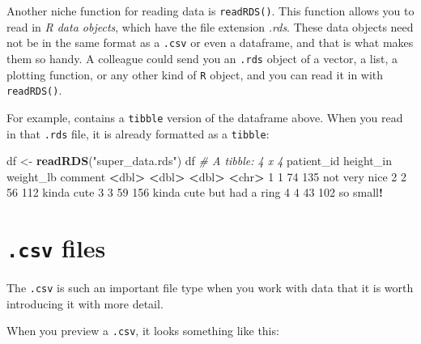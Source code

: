 \documentclass[]{book}
\newenvironment{Shaded}{\begin{snugshade}}{\end{snugshade}}
\newcommand{\CommentTok}[1]{\textcolor[rgb]{0.56,0.35,0.01}{\textit{#1}}}
\newcommand{\DecValTok}[1]{\textcolor[rgb]{0.00,0.00,0.81}{#1}}
\newcommand{\ErrorTok}[1]{\textcolor[rgb]{0.64,0.00,0.00}{\textbf{#1}}}
\newcommand{\KeywordTok}[1]{\textcolor[rgb]{0.13,0.29,0.53}{\textbf{#1}}}
\newcommand{\NormalTok}[1]{#1}
\newcommand{\OperatorTok}[1]{\textcolor[rgb]{0.81,0.36,0.00}{\textbf{#1}}}
\newcommand{\StringTok}[1]{\textcolor[rgb]{0.31,0.60,0.02}{#1}}
\begin{document}
Another niche function for reading data is \texttt{readRDS()}. This function allows you to read in \emph{R data objects}, which have the file extension \emph{.rds}. These data objects need not be in the same format as a \texttt{.csv} or even a dataframe, and that is what makes them so handy. A colleague could send you an \texttt{.rds} object of a vector, a list, a plotting function, or any other kind of \texttt{R} object, and you can read it in with \texttt{readRDS()}.

For example, contains a \texttt{tibble} version of the dataframe above. When you read in that \texttt{.rds} file, it is already formatted as a \texttt{tibble}:

\begin{Shaded}
\begin{Highlighting}[]
\NormalTok{df <-}\StringTok{ }\KeywordTok{readRDS}\NormalTok{(}\StringTok{"super_data.rds"}\NormalTok{)}
\NormalTok{df}
\CommentTok{# A tibble: 4 x 4}
\NormalTok{  patient_id height_in weight_lb comment                  }
       \OperatorTok{<}\NormalTok{dbl}\OperatorTok{>}\StringTok{     }\ErrorTok{<}\NormalTok{dbl}\OperatorTok{>}\StringTok{     }\ErrorTok{<}\NormalTok{dbl}\OperatorTok{>}\StringTok{ }\ErrorTok{<}\NormalTok{chr}\OperatorTok{>}\StringTok{                    }
\DecValTok{1}          \DecValTok{1}        \DecValTok{74}       \DecValTok{135}\NormalTok{ not very nice            }
\DecValTok{2}          \DecValTok{2}        \DecValTok{56}       \DecValTok{112}\NormalTok{ kinda cute               }
\DecValTok{3}          \DecValTok{3}        \DecValTok{59}       \DecValTok{156}\NormalTok{ kinda cute but had a ring}
\DecValTok{4}          \DecValTok{4}        \DecValTok{43}       \DecValTok{102}\NormalTok{ so small}\OperatorTok{!}\StringTok{                }
\end{Highlighting}
\end{Shaded}

\hypertarget{csv-files}{%
\section*{\texorpdfstring{\texttt{.csv} files}{.csv files}}\label{csv-files}}

The \texttt{.csv} is such an important file type when you work with data that it is worth introducing it with more detail.

When you preview a \texttt{.csv}, it looks something like this:
\end{document}
